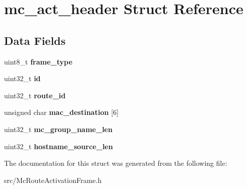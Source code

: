 \hypertarget{structmc__act__header}{\section{mc\-\_\-act\-\_\-header Struct Reference}
\label{structmc__act__header}
}
\subsection*{Data Fields}
\begin{DoxyCompactItemize}
\item 
\hypertarget{structmc__act__header_af88db7b3a5158b83f9ad547718dab6c0}{uint8\-\_\-t {\bfseries frame\-\_\-type}}\label{structmc__act__header_af88db7b3a5158b83f9ad547718dab6c0}

\item 
\hypertarget{structmc__act__header_aeef564ece98583af0ed36bd2f74582fd}{uint32\-\_\-t {\bfseries id}}\label{structmc__act__header_aeef564ece98583af0ed36bd2f74582fd}

\item 
\hypertarget{structmc__act__header_a49dcff159fe4cf35585f1ea12dd5d7ab}{uint32\-\_\-t {\bfseries route\-\_\-id}}\label{structmc__act__header_a49dcff159fe4cf35585f1ea12dd5d7ab}

\item 
\hypertarget{structmc__act__header_a88d04f9681b52e76ac7f6dc4e43f27cf}{unsigned char {\bfseries mac\-\_\-destination} \mbox{[}6\mbox{]}}\label{structmc__act__header_a88d04f9681b52e76ac7f6dc4e43f27cf}

\item 
\hypertarget{structmc__act__header_aa8384884b3fd6e4f79530f1bb7c3198f}{uint32\-\_\-t {\bfseries mc\-\_\-group\-\_\-name\-\_\-len}}\label{structmc__act__header_aa8384884b3fd6e4f79530f1bb7c3198f}

\item 
\hypertarget{structmc__act__header_a38439c7a8f0dc8c6f2940bde0bbabd9a}{uint32\-\_\-t {\bfseries hostname\-\_\-source\-\_\-len}}\label{structmc__act__header_a38439c7a8f0dc8c6f2940bde0bbabd9a}

\end{DoxyCompactItemize}


The documentation for this struct was generated from the following file\-:\begin{DoxyCompactItemize}
\item 
src/Mc\-Route\-Activation\-Frame.\-h\end{DoxyCompactItemize}
